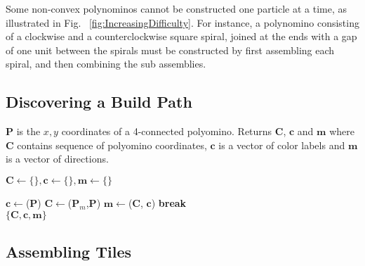 Some non-convex polynominos cannot be constructed one particle at a time, as illustrated in Fig. ~\ref{fig:IncreasingDifficulty}.    For instance, a polynomino consisting of a clockwise and a counterclockwise square spiral, joined at the ends with a gap of one unit between the spirals must be constructed by first assembling each spiral, and then combining the sub assemblies.




\subsection{Discovering a Build Path}


\begin{algorithm}
\newcommand\algotext[1]{\end{algorithmic}#1\begin{algorithmic}[1]}
\caption{($\mathbf{P})$   \label{alg:FindBuildPath}}
$\mathbf{P}$ is the $x,y$ coordinates of a 4-connected polyomino. 
Returns $ \mathbf{C} $, $ \mathbf{c} $ and $\mathbf{m}$ where $ \mathbf{C} $ contains sequence of polyomino coordinates, $ \mathbf{c} $ is a vector of color labels and $\mathbf{m}$ is a vector of directions.
\begin{algorithmic}[1]
\State\hbox{$\mathbf{C} \leftarrow \{\},\mathbf{c} \leftarrow \{\}, \mathbf{m} \leftarrow \{\}$}

\State$\mathbf{c}\leftarrow${}($\mathbf{P}$)
\State$\mathbf{C}\leftarrow${}($\mathbf{P}_m$,$\mathbf{P}$)
\State$ \mathbf{m}\leftarrow${}($\mathbf{C}$, $\mathbf{c}$)
\State \textbf{break}
\EndIf
\EndFor\\
\Return $\{ \mathbf{C},\mathbf{c}, \mathbf{m} \}$ 
\end{algorithmic}
\end{algorithm} 
  
\subsection{Assembling Tiles}


